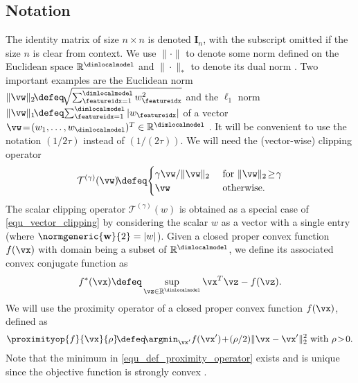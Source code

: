\documentclass[lettersize,journal]{IEEEtran}
\begin{document}
\subsection{Notation} %
The identity matrix of size $n\!\times\!n$ is denoted $\mathbf{I}_{n}$, with the subscript omitted
if the size $n$ is clear from context. We use $\| \cdot \|$ to denote some norm defined on the Euclidean 
space $\mathbb{R}^{\dimlocalmodel}$ and $\| \cdot \|_{*}$ to denote its dual norm \cite[Appx. 1.6.]{BoydConvexBook}. 
Two important examples are the Euclidean norm $\| \vw \|_{2} \!\defeq\!\sqrt{\sum_{\featureidx=1}^{\dimlocalmodel} w_{\featureidx}^{2}}$ and 
the $\ell_{1}$ norm $\| \vw \|_{1} \!\defeq\!\sum_{\featureidx=1}^{\dimlocalmodel} |w_{\featureidx}|$ of a vector $\vw \!= \!(w_{1},\ldots,w_{\dimlocalmodel})^{T} \in \mathbb{R}^{\dimlocalmodel}$ . 
It will be convenient to use the notation $(1/2\tau)$ instead of $(1/(2\tau))$. %
We will need the (vector-wise) clipping operator
\vspace{-2mm}
\begin{equation} 
\vspace{-2mm}
	\label{equ_vector_clipping}
	\mathcal{T}^{(\gamma)}(\vw)\!\defeq\! \begin{cases} \gamma \vw/\|\vw\|_{2} & \mbox{ for } \| \vw \|_{2} \!\geq\!\gamma \\
		\vw  & \mbox{ otherwise.} \end{cases} 
\end{equation} 
The scalar clipping operator $\mathcal{T}^{(\gamma)}(w)$ is obtained as a special case of \eqref{equ_vector_clipping} 
by considering the scalar $w$ as a vector with a single entry (where $\normgeneric{\mathbf{w}}{2} = |w|$). 
Given a closed proper convex function $f(\vx)$ with domain being a subset of $\mathbb{R}^{\dimlocalmodel}$, 
we define its associated convex conjugate function as \cite{BoydConvexBook}
\begin{equation} 
\label{equ_def_conv_conj}
f^{*} (\vx) \defeq \sup\limits_{\vz \in \mathbb{R}^{\dimlocalmodel}}  \vx^{T} \vz - f(\vz). 
\vspace{-2mm}
\end{equation} 
We will use the proximity operator of a closed proper convex function $f(\vx)$, 
defined as \cite{DistrOptStatistLearningADMM} 
\begin{equation}
\label{equ_def_proximity_operator}
\proximityop{f}{\vx}{\rho}\!\defeq\!\argmin_{\vx'} f(\vx')\!+\!(\rho/2) \| \vx - \vx'\|^{2}_{2} \mbox{ with } \rho\!>\!0.
\end{equation} 
Note that the minimum in \eqref{equ_def_proximity_operator} exists and is unique since the objective 
function is strongly convex \cite{BoydConvexBook}. 
\end{document}
